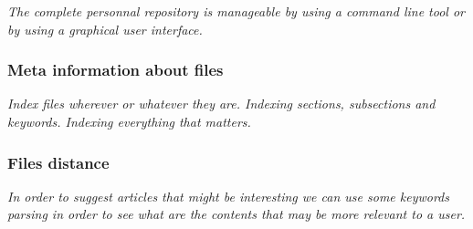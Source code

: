 \textit{The complete personnal repository is manageable by using a command line
tool or by using a graphical user interface.}

\subsubsection{Meta information about files}

\textit{Index files wherever or whatever they are. Indexing sections, subsections
and keywords. Indexing everything that matters.}

\subsubsection{Files distance}

\textit{In order to suggest articles that might be interesting we can use
some keywords parsing in order to see what are the contents that may be more
relevant to a user.}
